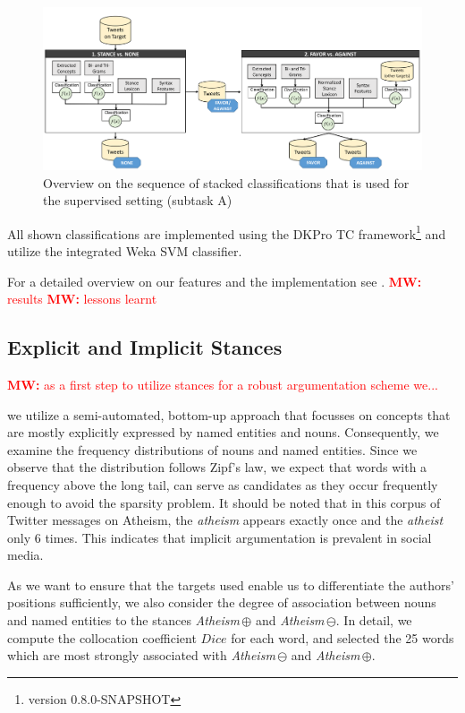 \documentclass[11pt]{article}
\newcommand{\mw}[1]{\textcolor{red}{\textbf{MW:} #1}}
\newcommand{\mw}[1]{}
\begin{document}
\begin{figure}
  \centering
  \includegraphics[scale=0.25]{figures/stance_skizze_new.png}
  \caption{Overview on the sequence of stacked classifications that is used for the supervised setting (subtask A)}
  \label{fig:sketch1}
\end{figure}

All shown classifications are implemented using the DKPro TC framework\footnote{version 0.8.0-SNAPSHOT} \cite{daxenberger-EtAl:2014:P14-5} and utilize the integrated Weka SVM classifier.

For a detailed overview on our features and the implementation see .
\mw{results}
\mw{lessons learnt}

\subsection{Explicit and Implicit Stances}
\mw{as a first step to utilize stances for a robust argumentation scheme we...}

 we utilize a semi-automated, bottom-up approach that focusses on concepts that are mostly explicitly expressed by named entities and nouns.
Consequently, we examine the frequency distributions of nouns and named entities.
Since we observe that the distribution follows Zipf's law, we expect that words with a frequency above the long tail, can serve as candidates as they occur frequently enough to avoid the sparsity problem.
It should be noted that in this corpus of Twitter messages on Atheism, the \textit{atheism} appears exactly once and the \textit{atheist} only 6 times.
This indicates that implicit argumentation is prevalent in social media.

As we want to ensure that the targets used enable us to differentiate the authors' positions sufficiently, we also consider the degree of association between nouns and named entities to the stances \textit{Atheism}\,$\oplus$ and \textit{Atheism}\,$\ominus$.
In detail, we compute the collocation coefficient $Dice$ \cite{smadja1996translating} for each word, and selected the 25 words which are most strongly associated with \textit{Atheism}\,$\ominus$ and \textit{Atheism}\,$\oplus$.
\end{document}
